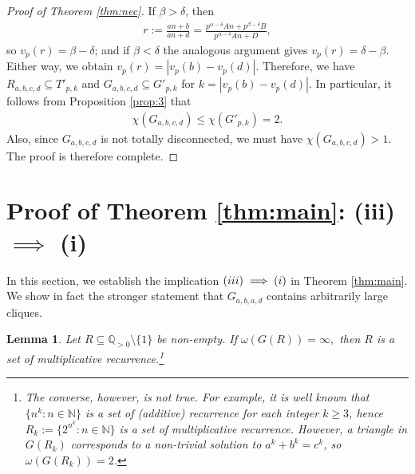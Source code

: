 \documentclass[12pt, reqno, a4paper]{amsart}
\newtheorem{lemma}{Lemma}[section]
\theoremstyle{definition}
\theoremstyle{remark}
\numberwithin{equation}{section}
\newcommand{\N}{\mathbb{N}}
\renewcommand{\leq}{\leqslant}
\renewcommand{\geq}{\geqslant}
\begin{document}
\begin{proof}[Proof of Theorem \ref{thm:nec}]
If \( \beta > \delta \), then 
\begin{align*}
r:=\frac{an+b}{an+d}=
\frac{p^{\alpha-\delta} An + p^{\beta-\delta}B}{p^{\alpha-\delta} An + D},
\end{align*}
so $v_p(r) = \beta-\delta$; and if $\beta<\delta$ the analogous argument gives $v_p(r) =\delta- \beta$. Either way, we obtain $v_p(r) = |v_p(b)-v_p(d)|.$  Therefore, we have $R_{a,b,c,d} \subseteq T'_{p,k}$ and $G_{a,b,c,d} \subseteq G'_{p,k}$ for $k=|v_p(b)-v_p(d)|.$  In particular, it follows from Proposition \ref{prop:3} that
\begin{align*}
\chi(G_{a,b,c,d}) \leq \chi(G'_{p,k}) = 2.
\end{align*}
Also, since \( G_{a,b,c,d} \) is not totally disconnected, we must have \( \chi(G_{a,b,c,d}) > 1 \). The proof is therefore complete.
\end{proof}

\section{Proof of Theorem \ref{thm:main}: \textnormal{(iii)} $\implies$ \textnormal{(i)}}

In this section, we establish the implication $\textnormal{(iii)} \implies \textnormal{(i)}$ in Theorem \ref{thm:main}. We show in fact the stronger statement that $G_{a,b,a,d}$ contains arbitrarily large cliques. 

\begin{lemma} \label{lem:moreira}
Let $R \subseteq \mathbb{Q}_{>0} \setminus \{1\}$ be non-empty. If $\omega(G(R))=\infty,$ then $R$ is a set of multiplicative recurrence.\footnote{The converse, however, is not true. For example, it is well known that $\{n^k: n\in\N\}$ is a set of (additive) recurrence for each integer $k \geq 3$, hence $R_k:= \{2^{n^k} :n\in \N\}$ is a set of multiplicative recurrence. However, a triangle in $G(R_k)$ corresponds to a non-trivial solution to $a^k+b^k = c^k$, so $\omega(G(R_k))=2$.} 
\end{lemma}
\end{document}
